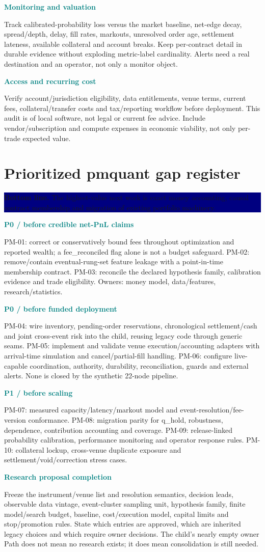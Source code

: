 \documentclass[10pt,letterpaper]{article}
\newcommand{\bl}[1]{\noindent\colorbox{navy}{\parbox{\dimexpr\linewidth-2\fboxsep}{\color{white}\textbf{Bottom line.} #1}}\par\medskip}
\newcommand{\topic}[2]{\clearpage\section{#1}\bl{#2}}
\newcommand{\sub}[1]{\par\textbf{\textcolor{teal}{#1}}\par}
\begin{document}
\sub{Monitoring and valuation}
Track calibrated-probability loss versus the market baseline, net-edge decay, spread/depth, delay, fill rates, markouts, unresolved order age, settlement lateness, available collateral and account breaks. Keep per-contract detail in durable evidence without exploding metric-label cardinality. Alerts need a real destination and an operator, not only a monitor object.
\sub{Access and recurring cost}
Verify account/jurisdiction eligibility, data entitlements, venue terms, current fees, collateral/transfer costs and tax/reporting workflow before deployment. This audit is of local software, not legal or current fee advice. Include vendor/subscription and compute expenses in economic viability, not only per-trade expected value.
\topic{Prioritized pmquant gap register}{The highest-value next work is exact money accounting, causal contract membership and migration of existing portfolio machinery.}
\sub{P0 / before credible net-PnL claims}
PM-01: correct or conservatively bound fees throughout optimization and reported wealth; a fee\_reconciled flag alone is not a budget safeguard. PM-02: remove/contain eventual-rung-set feature leakage with a point-in-time membership contract. PM-03: reconcile the declared hypothesis family, calibration evidence and trade eligibility. Owners: money model, data/features, research/statistics.
\sub{P0 / before funded deployment}
PM-04: wire inventory, pending-order reservations, chronological settlement/cash and joint cross-event risk into the child, reusing legacy code through generic seams. PM-05: implement and validate venue execution/accounting adapters with arrival-time simulation and cancel/partial-fill handling. PM-06: configure live-capable coordination, authority, durability, reconciliation, guards and external alerts. None is closed by the synthetic 22-node pipeline.
\sub{P1 / before scaling}
PM-07: measured capacity/latency/markout model and event-resolution/fee-version conformance. PM-08: migration parity for q\_hold, robustness, dependence, contribution accounting and coverage. PM-09: release-linked probability calibration, performance monitoring and operator response rules. PM-10: collateral lockup, cross-venue duplicate exposure and settlement/void/correction stress cases.
\sub{Research proposal completion}
Freeze the instrument/venue list and resolution semantics, decision leads, observable data vintage, event-cluster sampling unit, hypothesis family, finite model/search budget, baseline, cost/execution model, capital limits and stop/promotion rules. State which entries are approved, which are inherited legacy choices and which require owner decisions. The child's nearly empty owner Path does not mean no research exists; it does mean consolidation is still needed.
\end{document}
